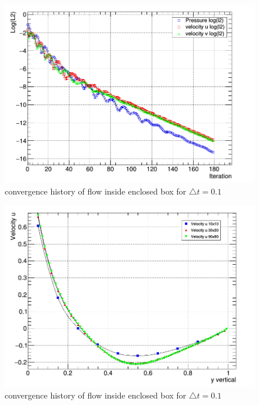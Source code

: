 \documentclass[paper=a4, fontsize=11pt, abstract=on]{scrartcl}
\numberwithin{equation}{section}		%
\numberwithin{figure}{section}			%
\numberwithin{table}{section}				%
\begin{document}
\begin{figure}[H]
\centering
\includegraphics[width=0.80\linewidth]{con3}
\caption{convergence history of flow inside enclosed box for $\triangle t = 0.1$}
\label{conh}
\end{figure}

\begin{figure}[H]
\centering
\includegraphics[width=0.80\linewidth]{grid1}
\caption{convergence history of flow inside enclosed box for $\triangle t = 0.1$}
\label{conh}
\end{figure}
\end{document}
